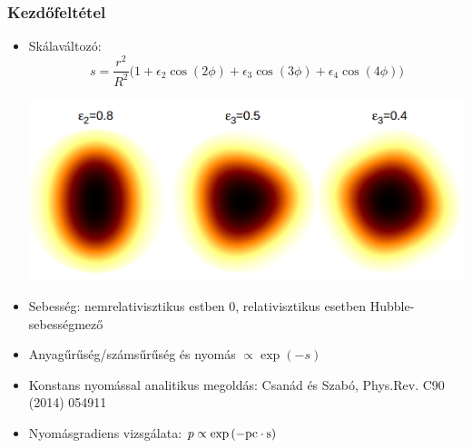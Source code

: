 \documentclass{beamer}
\begin{document}
\section{}
\begin{frame}
\frametitle{Kezdőfeltétel}
\begin{itemize}
\item<1-> Skálaváltozó: 
\begin{equation*}
s=\frac{r^2}{R^2}\Big(1+\epsilon_2\cos(2\phi)+\epsilon_3\cos(3\phi)+\epsilon_4\cos(4\phi)\Big)
\end{equation*}
\begin{center}
\includegraphics[scale=0.15]{pic/a1}
\end{center}
\item<2-> Sebesség: nemrelativisztikus estben $0$, relativisztikus esetben Hubble-sebességmező
\item<2-> Anyagűrűség/számsűrűség és nyomás $\propto \exp{(-s)}$
\item<3-> Konstans nyomással analitikus megoldás: Csanád és Szabó, Phys.Rev. C90 (2014) 054911
\item<3-> Nyomásgradiens vizsgálata: $p \propto \exp{(-\rm{pc}\cdot s)}$
\end{itemize}
\end{frame}
\end{document}

